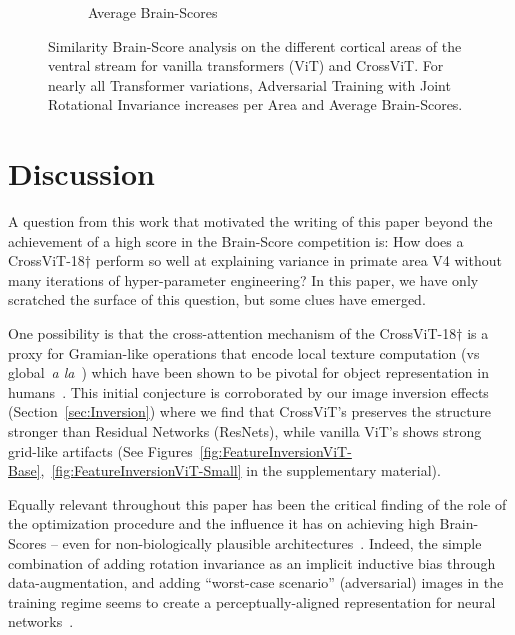 \documentclass{article} %
\begin{document}
\begin{figure}[!h]
\begin{subfigure}{0.33\textwidth}
  \caption{Average Brain-Scores}
  \label{fig:6}
\end{subfigure}
\caption{Similarity Brain-Score analysis on the different cortical areas of the ventral stream for vanilla transformers (ViT) and CrossViT. For nearly all Transformer variations, Adversarial Training with Joint Rotational Invariance increases per Area and Average Brain-Scores.}
\label{fig:TransformerComparison}
\end{figure}

\clearpage
\newpage

\section{Discussion}
A question from this work that motivated the writing of this paper beyond the achievement of a high score in the Brain-Score competition is: How does a CrossViT-18$\dagger$ perform so well at explaining variance in primate area V4 without many iterations of hyper-parameter engineering? In this paper, we have only scratched the surface of this question, but some clues have emerged. 

One possibility is that the cross-attention mechanism of the CrossViT-18$\dagger$ is a proxy for Gramian-like operations that encode local texture computation (vs global~\textit{a la}~\cite{geirhos2018imagenettrained}) which have been shown to be pivotal for object representation in humans~\citep{long2018mid,jagadeesh2022texture,harrington2022finding}. This initial conjecture is corroborated by our image inversion effects (Section~\ref{sec:Inversion}) where we find that CrossViT's preserves the structure stronger than Residual Networks (ResNets), while vanilla ViT's shows strong grid-like artifacts (See Figures~\ref{fig:FeatureInversionViT-Base},~\ref{fig:FeatureInversionViT-Small} in the supplementary material).

Equally relevant throughout this paper has been the critical finding of the role of the optimization procedure and the influence it has on achieving high Brain-Scores -- even for non-biologically plausible architectures~\citep{riedel2022bag}. Indeed, the simple combination of adding rotation invariance as an implicit inductive bias through data-augmentation, and adding ``worst-case scenario'' (adversarial) images in the training regime seems to create a perceptually-aligned representation for neural networks~\citep{santurkar2019image}.
\end{document}
